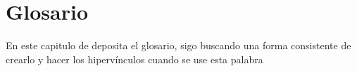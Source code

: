 \chapter{Glosario}

En este capitulo de deposita el glosario, sigo buscando una forma consistente de crearlo y hacer los hipervínculos cuando se use esta palabra